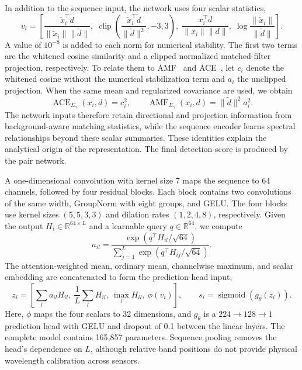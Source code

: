 \documentclass[a4paper,11pt]{article}
\newcommand{\R}{\mathbb{R}}
\newcommand{\sigmoid}{\operatorname{sigmoid}}
\newcommand{\clip}{\operatorname{clip}}
\begin{document}
In addition to the sequence input, the network uses four scalar statistics,
\begin{equation}
v_i=\left[
\frac{\widetilde x_i^\top\widetilde d}{\|\widetilde x_i\|\|\widetilde d\|},\;
\clip\!\left(\frac{\widetilde x_i^\top\widetilde d}{\|\widetilde d\|^2},-3,3\right),\;
\frac{x_i^\top d}{\|x_i\|\|d\|},\;
\log\frac{\|\widetilde x_i\|}{\|\widetilde d\|}
\right].
\end{equation}
A value of $10^{-8}$ is added to each norm for numerical stability. The first two terms are the whitened cosine similarity and a clipped normalized matched-filter projection, respectively. To relate them to AMF~\cite{amf} and ACE~\cite{ace}, let $c_i$ denote the whitened cosine without the numerical stabilization term and $a_i$ the unclipped projection. When the same mean and regularized covariance are used, we obtain
\begin{equation}
\operatorname{ACE}_{\Sigma_\gamma}(x_i,d)=c_i^2,\qquad
\operatorname{AMF}_{\Sigma_\gamma}(x_i,d)=\|\widetilde d\|^2a_i^2.
\end{equation}
The network inputs therefore retain directional and projection information from background-aware matching statistics, while the sequence encoder learns spectral relationships beyond these scalar summaries. These identities explain the analytical origin of the representation. The final detection score is produced by the pair network.

A one-dimensional convolution with kernel size 7 maps the sequence to 64 channels, followed by four residual blocks. Each block contains two convolutions of the same width, GroupNorm with eight groups, and GELU. The four blocks use kernel sizes $(5,5,3,3)$ and dilation rates $(1,2,4,8)$, respectively. Given the output $H_i\in\R^{64\times L}$ and a learnable query $q\in\R^{64}$, we compute
\begin{equation}
a_{il}=\frac{\exp(q^\top H_{il}/\sqrt{64})}{\sum_{j=1}^{L}\exp(q^\top H_{ij}/\sqrt{64})}.
\end{equation}
The attention-weighted mean, ordinary mean, channelwise maximum, and scalar embedding are concatenated to form the prediction-head input,
\begin{equation}
z_i=\left[\sum_l a_{il}H_{il},\ \frac{1}{L}\sum_lH_{il},\ \max_lH_{il},\ \phi(v_i)\right],
\qquad s_i=\sigmoid(g_\theta(z_i)).
\end{equation}
Here, $\phi$ maps the four scalars to 32 dimensions, and $g_\theta$ is a $224\to128\to1$ prediction head with GELU and dropout of 0.1 between the linear layers. The complete model contains 165,857 parameters. Sequence pooling removes the head's dependence on $L$, although relative band positions do not provide physical wavelength calibration across sensors.
\end{document}
